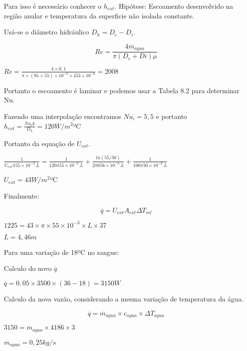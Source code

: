 Para isso é necessário conhecer o $h_{ext}$. Hipótese: Escoamento desenvolvido na região anular e temperatura da superficie não isolada constante.

Usá-se o diâmetro hidráulico $D_{h}= D_{e}-D_{i}$.

\[Re=\frac{4\stackrel{.}{m}_{agua}}{\pi (D_{e}+D{i})\mu}\]

$Re=\frac{4\times 0,1}{\pi \times (85+55)\times 10^{-3}\times 453\times 10^{-6}}= 2008$

Portanto o escoamento é laminar e podemos usar a Tabela 8.2 para determinar Nu.

Fazendo uma interpolação encontramos $Nu_{i}=5,5$ e portanto $h_{ext}=\frac{Nu_{i}k}{D_{h}}=120W/m^2$ºC

Portanto da equação de $U_{ext}$.

$\frac{1}{U_{ext}\pi 55\times 10^{-3}.L}=\frac{1}{120\pi 55\times 10^{-3}.L} + \frac{ln(55/50)}{2\pi 656\times 10^{-3}.L} + \frac{1}{100\pi 50\times 10^{-3}.L}$

$U_{ext}= 43W/m^2$ºC

Finalmente:

\[\stackrel{.}{q} = U_{ext}A_{ext}\Delta T_{ml}\]

$1225=43\times \pi \times 55\times 10^{-3}\times L\times 37$

$L=4,46m$

Para uma variação de 18ºC no sangue:

Calculo do novo $\stackrel{.}{q}$

$\stackrel{.}{q} = 0,05 \times 3500 \times (36 - 18) = 3150W$

Calculo da nova vazão, considerando a mesma variação de temperatura da água.

\[\stackrel{.}{q} = \stackrel{.}{m}_{agua}\times c_{agua} \times \Delta T_{agua}\]

$3150 = \stackrel{.}{m}_{agua}\times 4186 \times 3$

$\stackrel{.}{m}_{agua}= 0,25kg/s$